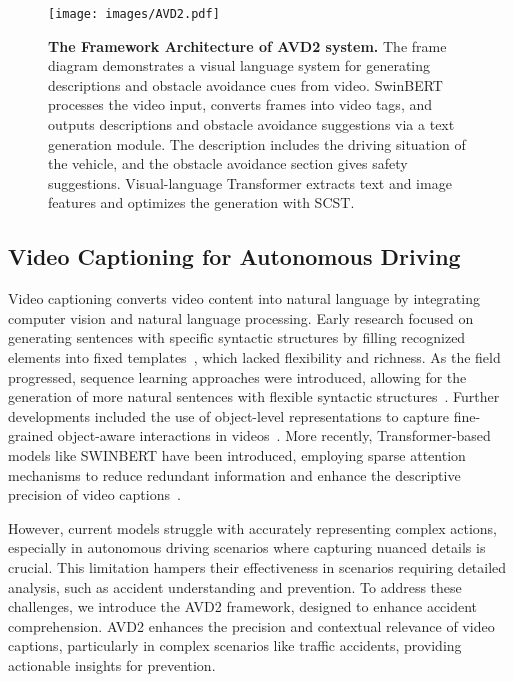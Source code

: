 \begin{figure*}[htbp]
\centering
\texttt{[image: images/AVD2.pdf]} %
\caption{\textbf{The Framework Architecture of AVD2 system.} {\footnotesize The frame diagram demonstrates a visual language system for generating descriptions and obstacle avoidance cues from video. SwinBERT processes the video input, converts frames into video tags, and outputs descriptions and obstacle avoidance suggestions via a text generation module. The description includes the driving situation of the vehicle, and the obstacle avoidance section gives safety suggestions. Visual-language Transformer extracts text and image features and optimizes the generation with SCST.}}
\label{fig:method}
\vspace{-1em}
\end{figure*}

\subsection{Video Captioning for Autonomous Driving}

Video captioning converts video content into natural language by integrating computer vision and natural language processing. Early research focused on generating sentences with specific syntactic structures by filling recognized elements into fixed templates~\cite{inoue2023towards}, which lacked flexibility and richness. As the field progressed, sequence learning approaches were introduced, allowing for the generation of more natural sentences with flexible syntactic structures~\cite{venugopalan2015sequence}. Further developments included the use of object-level representations to capture fine-grained object-aware interactions in videos~\cite{gao2023retrieval}. More recently, Transformer-based models like SWINBERT have been introduced, employing sparse attention mechanisms to reduce redundant information and enhance the descriptive precision of video captions~\cite{wang2021end,lin2022swinbert,liu2023delving,zheng2024monoocc}.

However, current models struggle with accurately representing complex actions, especially in autonomous driving scenarios where capturing nuanced details is crucial. This limitation hampers their effectiveness in scenarios requiring detailed analysis, such as accident understanding and prevention. To address these challenges, we introduce the AVD2 framework, designed to enhance accident comprehension. AVD2 enhances the precision and contextual relevance of video captions, particularly in complex scenarios like traffic accidents, providing actionable insights for prevention.

